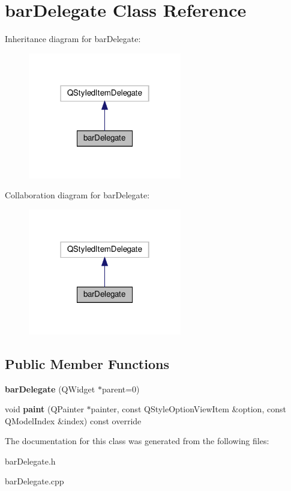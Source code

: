 \hypertarget{classbar_delegate}{}\section{bar\+Delegate Class Reference}
\label{classbar_delegate}


Inheritance diagram for bar\+Delegate\+:\nopagebreak
\begin{figure}[H]
\begin{center}
\leavevmode
\includegraphics[width=190pt]{classbar_delegate__inherit__graph}
\end{center}
\end{figure}


Collaboration diagram for bar\+Delegate\+:\nopagebreak
\begin{figure}[H]
\begin{center}
\leavevmode
\includegraphics[width=190pt]{classbar_delegate__coll__graph}
\end{center}
\end{figure}
\subsection*{Public Member Functions}
\begin{DoxyCompactItemize}
\item 
\mbox{\label{classbar_delegate_af31b0c196427b7856e88167594253f44}} 
{\bfseries bar\+Delegate} (Q\+Widget $\ast$parent=0)
\item 
\mbox{\label{classbar_delegate_ab3f8bec486210494bdd9ecb7179ef355}} 
void {\bfseries paint} (Q\+Painter $\ast$painter, const Q\+Style\+Option\+View\+Item \&option, const Q\+Model\+Index \&index) const override
\end{DoxyCompactItemize}


The documentation for this class was generated from the following files\+:\begin{DoxyCompactItemize}
\item 
bar\+Delegate.\+h\item 
bar\+Delegate.\+cpp\end{DoxyCompactItemize}
